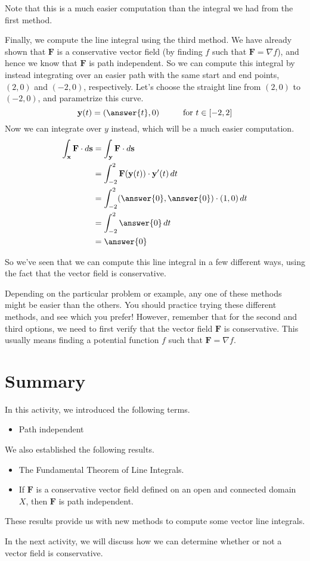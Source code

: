 \documentclass{ximera}
\begin{document}
\begin{example}
\begin{explanation}
Note that this is a much easier computation than the integral we had from the first method.

Finally, we compute the line integral using the third method. We have already shown that $\mathbf{F}$ is a conservative vector field (by finding $f$ such that $\mathbf{F}=\nabla f$), and hence we know that $\mathbf{F}$ is path independent. So we can compute this integral by instead integrating over an easier path with the same start and end points, $(2,0)$ and $(-2,0)$, respectively. Let's choose the straight line from $(2,0)$ to $(-2,0)$, and parametrize this curve.
\[
\textbf{y}(t)=(\answer{t}, 0)\hspace{1cm} \textrm{for }t\in[-2,2]
\]
Now we can integrate over $y$ instead, which will be a much easier computation.
\begin{align*}
\int_{\textbf{x}}\textbf{F}\cdot d\textbf{s}  &= \int_{\textbf{y}}\textbf{F}\cdot d\textbf{s}\\
&= \int_{-2}^{2} \textbf{F}(\textbf{y}(t))\cdot \textbf{y}'(t)\,dt\\
&= \int_{-2}^{2} (\answer{0},\answer{0})\cdot (1,0)\,dt\\
&= \int_{-2}^{2} \answer{0}\,dt\\
&= \answer{0}
\end{align*}

So we've seen that we can compute this line integral in a few different ways, using the fact that the vector field is conservative.
\end{explanation}
\end{example}

Depending on the particular problem or example, any one of these methods might be easier than the others. You should practice trying these different methods, and see which you prefer! However, remember that for the second and third options, we need to first verify that the vector field $\mathbf{F}$ is conservative. This usually means finding a potential function $f$ such that $\mathbf{F}=\nabla f$.

\section{Summary}

In this activity, we introduced the following terms.
\begin{itemize}
\item Path independent
\end{itemize}
We also established the following results.
\begin{itemize}
\item The Fundamental Theorem of Line Integrals.
\item If $\textbf{F}$ is a conservative vector field defined on an open and connected domain $X$, then $\textbf{F}$ is path independent.
\end{itemize}

These results provide us with new methods to compute some vector line integrals.

In the next activity, we will discuss how we can determine whether or not a vector field is conservative.
\end{document}
